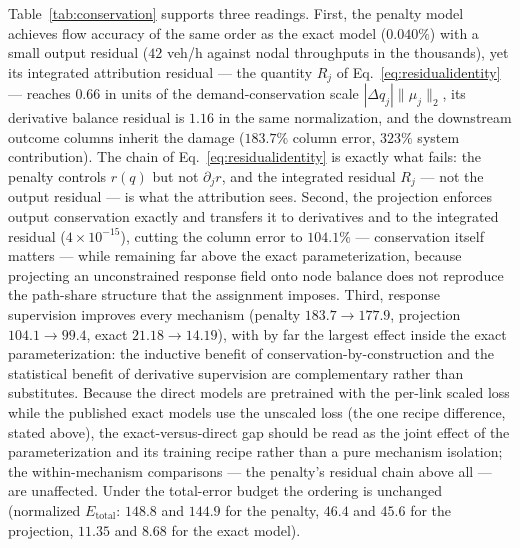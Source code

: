 Table~\ref{tab:conservation} supports three readings. First, the
penalty model achieves flow accuracy of the same order as the exact
model ($0.040\%$) with a small output residual ($42$ veh/h against
nodal throughputs in the thousands), yet its integrated attribution
residual --- the quantity $R_j$ of Eq.~\eqref{eq:residualidentity}
--- reaches $0.66$ in units of the demand-conservation scale
$|\Delta q_j|\|\mu_j\|_2$, its derivative balance residual is
$1.16$ in the same normalization, and the downstream outcome columns
inherit the damage ($183.7\%$ column error, $323\%$ system
contribution). The chain of Eq.~\eqref{eq:residualidentity} is
exactly what fails: the penalty controls $r(q)$ but not
$\partial_jr$, and the integrated residual $R_j$ --- not the output
residual --- is what the attribution sees. Second, the projection
enforces output conservation exactly and transfers it to derivatives
and to the integrated residual ($4\times10^{-15}$), cutting the
column error to $104.1\%$ --- conservation itself matters --- while
remaining far above the exact parameterization, because projecting an
unconstrained response field onto node balance does not reproduce the
path-share structure that the assignment imposes. Third, response
supervision improves every mechanism (penalty $183.7\to177.9$,
projection $104.1\to99.4$, exact $21.18\to14.19$), with by far the
largest effect inside the exact parameterization: the inductive
benefit of conservation-by-construction and the statistical benefit
of derivative supervision are complementary rather than substitutes.
Because the direct models are pretrained with the per-link scaled
loss while the published exact models use the unscaled loss (the one
recipe difference, stated above), the exact-versus-direct gap should
be read as the joint effect of the parameterization and its training
recipe rather than a pure mechanism isolation; the within-mechanism
comparisons --- the penalty's residual chain above all --- are
unaffected. Under the total-error budget the ordering is unchanged
(normalized $E_{\mathrm{total}}$: $148.8$ and $144.9$ for the penalty,
$46.4$ and $45.6$ for the projection, $11.35$ and $8.68$ for the
exact model).
